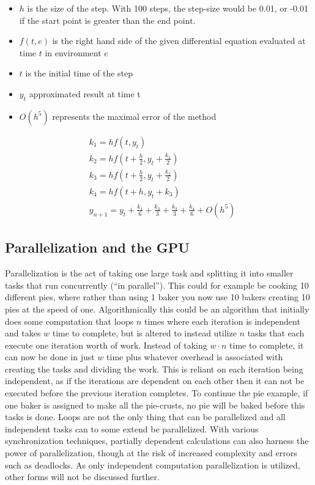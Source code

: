 \begin{itemize}
\item $h$ is the size of the step. With 100 steps, the step-size would be 0.01, or -0.01 if the start point is greater than the end point.
\item $f(t, e)$  is the right hand side of the given differential equation evaluated at time $t$ in environment $e$
\item $t$ is the initial time of the step
\item $y_t$ approximated result at time t
\item $O(h^5)$ represents the maximal error of the method
\end{itemize}

\begin{equation}\begin{aligned}\label{eq:rk4}
&k_1 = h f(t, y_t)\\
&k_2 = h f(t + \frac{h}{2}, y_t + \frac{k_1}{2})\\
&k_3 = h f(t + \frac{h}{2}, y_t + \frac{k_2}{2})\\
&k_4 = h f(t + h, y_t + k_3)\\
&y_{n+1} = y_t + \frac{k_1}{6} + \frac{k_2}{3} + \frac{k_3}{3} + \frac{k_4}{6} + O(h^5)
\end{aligned}\end{equation}


\subsection{Parallelization and the GPU}\label{subsec:background:parallelization}
Parallelization is the act of taking one large task and splitting it into smaller tasks that run concurrently (``in parallel'').
This could for example be cooking 10 different pies, where rather than using 1 baker you now use 10 bakers creating 10 pies at the speed of one.
Algorithmically this could be an algorithm that initially does some computation that loops $n$ times where each iteration is independent and takes $w$ time to complete, but is altered to instead utilize $n$ tasks that each execute one iteration worth of work.
Instead of taking $w \cdot n$ time to complete, it can now be done in just $w$ time plus whatever overhead is associated with creating the tasks and dividing the work.
This is reliant on each iteration being independent, as if the iterations are dependent on each other then it can not be executed before the previous iteration completes.
To continue the pie example, if one baker is assigned to make all the pie-crusts, no pie will be baked before this tasks is done.
Loops are not the only thing that can be parallelized and all independent tasks can to some extend be parallelized. 
With various synchronization techniques, partially dependent calculations can also harness the power of parallelization, though at the risk of increased complexity and errors such as deadlocks.
As only independent computation parallelization is utilized, other forms will not be discussed further.

